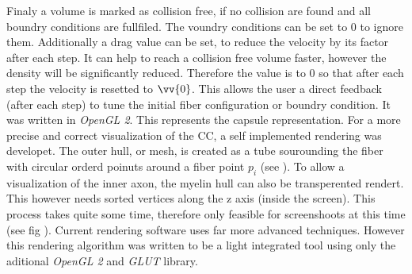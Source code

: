 % 
Finaly a volume is marked as collision free, if no collision are found and all boundry conditions are fullfiled. 
The voundry conditions can be set to 0 to ignore them.
Additionally a drag value can be set, to reduce the velocity by its factor after each step.
It can help to reach a collision free volume faster, however the density will be significantly reduced.
Therefore the value is to 0 so that after each step the velocity is resetted to $\vv{0}$. 
% 
%
% 
% 
This allows the user a direct feedback (\eg after each step) to tune the initial fiber configuration or boundry condition.
It was written in \textit{OpenGL 2}.
This represents the capsule representation.
For a more precise and correct visualization of the \ac{CC}, a self implemented rendering was developet.
The outer hull, or mesh, is created as a tube sourounding the fiber with circular orderd poinuts around a fiber point $p_i$ (see \dummy).
To allow a visualization of the inner axon, the myelin hull can also be transperented rendert.
This however needs sorted vertices along the z axis (inside the screen).
This process takes quite some time, therefore only feasible for screenshoots at this time (see fig \dummy).
Current rendering software uses far more advanced techniques.
However this rendering algorithm was written to be a light integrated tool using only the aditional \textit{OpenGL 2} and \textit{GLUT} library.\\
